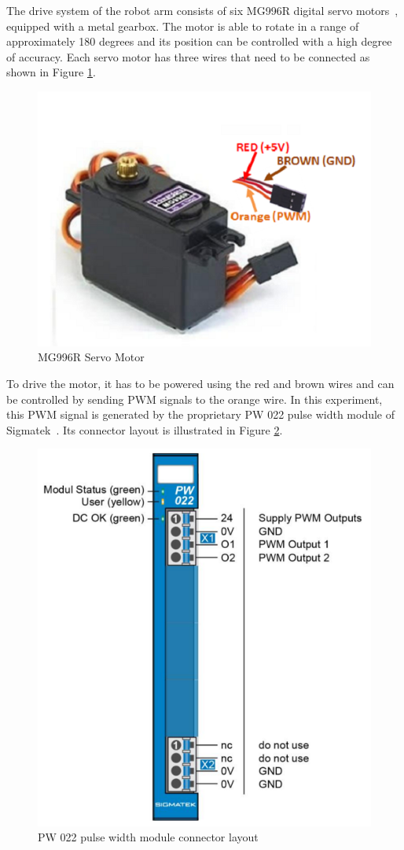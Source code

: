 \documentclass[MMR,Master,english]{twbook}
\begin{document}
\noindent The drive system of the robot arm consists of six MG996R digital servo motors~\cite{MG996RServoMotor}, equipped with a metal gearbox. The motor is able to rotate in a range of approximately 180 degrees and its position can be controlled with a high degree of accuracy. Each servo motor has three wires that need to be connected as shown in Figure \ref{fig:motor_wires}.

\begin{figure}[H]
	\centering
	\includegraphics[width=0.45\columnwidth]{img/experiment/motor_wires.png}
	\caption[MG996R Servo Motor]{MG996R Servo Motor~\cite{MG996RServoMotor}}
	\label{fig:motor_wires}
\end{figure}

\noindent To drive the motor, it has to be powered using the red and brown wires and can be controlled by sending PWM signals to the orange wire. In this experiment, this PWM signal is generated by the proprietary PW 022 pulse width module of Sigmatek~\cite{DigitalOutputSIGMATEK}. Its connector layout is illustrated in Figure \ref{fig:pw022_connectors}.

\begin{figure}[H]
	\centering
	\includegraphics[width=0.5\columnwidth]{img/experiment/pw022_connectors.png}
	\caption[PW 022 pulse width module connector layout]{PW 022 pulse width module connector layout~\cite{DigitalOutputSIGMATEK}}
	\label{fig:pw022_connectors}
\end{figure}
\end{document}
